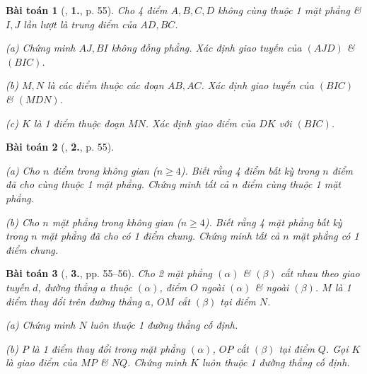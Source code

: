 \documentclass{article}
\numberwithin{equation}{section}
\newtheorem{baitoan}{Bài toán}[section]
\begin{document}
\begin{baitoan}[\cite{TL_chuyen_Toan_Hinh_Hoc_11}, \textbf{1.}, p. 55]
	Cho 4 điểm $A,B,C,D$ không cùng thuộc 1 mặt phẳng \& $I,J$ lần lượt là trung điểm của $AD,BC$.
	\begin{enumerate*}
		\item[(a)] Chứng minh $AJ,BI$ không đồng phẳng. Xác định giao tuyến của $(AJD)$ \& $(BIC)$.
		\item[(b)] $M,N$ là các điểm thuộc các đoạn $AB,AC$. Xác định giao tuyến của $(BIC)$ \& $(MDN)$.
		\item[(c)] $K$ là 1 điểm thuộc đoạn $MN$. Xác định giao điểm của $DK$ với $(BIC)$.
	\end{enumerate*}
\end{baitoan}

\begin{baitoan}[\cite{TL_chuyen_Toan_Hinh_Hoc_11}, \textbf{2.}, p. 55]
	\begin{enumerate*}
		\item[(a)] Cho $n$ điểm trong không gian ($n\ge 4$). Biết rằng 4 điểm bất kỳ trong $n$ điểm đã cho cùng thuộc 1 mặt phẳng. Chứng minh tất cả $n$ điểm cùng thuộc 1 mặt phẳng.
		\item[(b)] Cho $n$ mặt phẳng trong không gian ($n\ge 4$). Biết rằng 4 mặt phẳng bất kỳ trong $n$ mặt phẳng đã cho có 1 điểm chung. Chứng minh tất cả $n$ mặt phẳng có 1 điểm chung.
	\end{enumerate*}
\end{baitoan}

\begin{baitoan}[\cite{TL_chuyen_Toan_Hinh_Hoc_11}, \textbf{3.}, pp. 55--56]
	Cho 2 mặt phẳng $(\alpha)$ \& $(\beta)$ cắt nhau theo giao tuyến $d$, đường thẳng $a$ thuộc $(\alpha)$, điểm $O$ ngoài $(\alpha)$ \& ngoài $(\beta)$. $M$ là 1 điểm thay đổi trên đường thẳng $a$, $OM$ cắt $(\beta)$ tại điểm $N$.
	\begin{enumerate*}
		\item[(a)] Chứng minh $N$ luôn thuộc 1 đường thẳng cố định.
		\item[(b)] $P$ là 1 điểm thay đổi trong mặt phẳng $(\alpha)$, $OP$ cắt $(\beta)$ tại điểm $Q$. Gọi $K$ là giao điểm của $MP$ \& $NQ$. Chứng minh $K$ luôn thuộc 1 đường thẳng cố định.
	\end{enumerate*}	
\end{baitoan}
\end{document}
